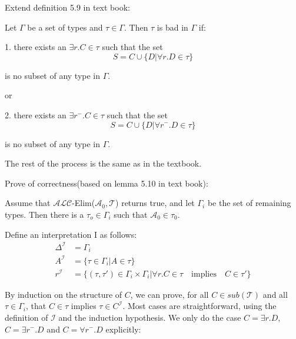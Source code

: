\documentclass[12pt]{article}
\def \T {\mathcal{T}}
\def \A {\mathcal{A}}
\def \I {\mathcal{I}}
\begin{document}
    Extend definition 5.9 in text book: \par
    Let $\varGamma$ be a set of types and $\tau \in \varGamma$. Then $\tau$ is bad in $\varGamma$ if: \par
    1. there exists an $\exists r.C \in \tau$ such that the set$$ S = {C} \cup \{D|\forall r.D \in \tau \}$$ \par is no subset of any type in $\varGamma$.  \par
    or \par
    2. there exists an $\exists r^{-}.C \in \tau$ such that the set $$ S = {C} \cup \{D|\forall r^{-}.D \in \tau \}$$ \par is no subset of any type in $\varGamma$. \par
    The rest of the process is the same as in the textbook. \par
    Prove of correctness(based on lemma 5.10 in text book): \par
    Assume that $\mathcal{ALC}$-Elim($\A_0, \T$) returns true, and let $\varGamma_i$ be the set of remaining types. Then there is a $\tau_o \in \varGamma_i$ such that $\A_0 \in \tau_0$. \par
    Define an interpretation I as follows: 
    \begin{align*}
        \Delta^{\I} & = \varGamma_i\\
        A^{\I} & = \{ \tau \in \varGamma_i | A \in \tau \} \\
        r^{\I} & = \{(\tau,\tau') \in \varGamma_i \times \varGamma_i | \forall r.C \in \tau \quad \text{implies} \quad C \in \tau'\}
    \end{align*} \par
    By induction on the structure of $C$, we can prove, for all $C \in sub(\T)$ and all $\tau \in \varGamma_i$, that $C \in \tau$ implies $\tau \in C^{\I}$. Most cases are straightforward, using the definition of $\I$ and the induction hypothesis. We only do the case $C = \exists r. D$, $C = \exists r^{-}.D$ and $C = \forall r^{-}.D$ explicitly: \par
\end{document}
